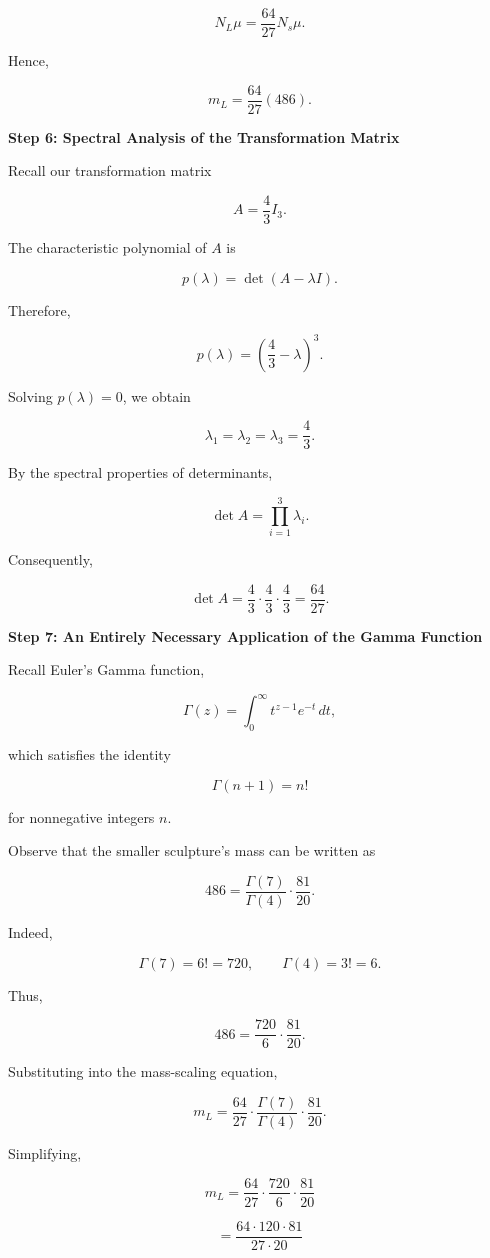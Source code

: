 \begin{enumerate}
 
 \[N_L\mu=\frac{64}{27}N_s\mu.\]

 Hence,

 
 \[m_L=\frac{64}{27}(486).\]

 \textbf{Step 6: Spectral Analysis of the Transformation Matrix}

 Recall our transformation matrix

 
 \[A=\frac43 I_3.\]

 The characteristic polynomial of $A$ is

 
 \[p(\lambda)=\det(A-\lambda I).\]

 Therefore,

 
 \[p(\lambda)=\left(\frac43-\lambda\right)^3.\]

 Solving $p(\lambda)=0$, we obtain

 
 \[\lambda_1=\lambda_2=\lambda_3=\frac43.\]

 By the spectral properties of determinants,

 
 \[\det A=\prod_{i=1}^{3}\lambda_i.\]

 Consequently,

 
 \[\det A=\frac43\cdot\frac43\cdot\frac43=\frac{64}{27}.\]

 \textbf{Step 7: An Entirely Necessary Application of the Gamma Function}

 Recall Euler's Gamma function,

 
 \[\Gamma(z)=\int_0^\infty t^{z-1}e^{-t}\,dt,\]

 which satisfies the identity

 
 \[\Gamma(n+1)=n!\]

 for nonnegative integers $n$.

 Observe that the smaller sculpture's mass can be written as

 
 \[486=\frac{\Gamma(7)}{\Gamma(4)}\cdot\frac{81}{20}.\]

 Indeed,

 
 \[\Gamma(7)=6!=720,\qquad \Gamma(4)=3!=6.\]

 Thus,

 
 \[486=\frac{720}{6}\cdot\frac{81}{20}.\]

 Substituting into the mass-scaling equation,

 
 \[m_L=\frac{64}{27}\cdot\frac{\Gamma(7)}{\Gamma(4)}\cdot\frac{81}{20}.\]

 Simplifying,

 
 \[m_L=\frac{64}{27}\cdot\frac{720}{6}\cdot\frac{81}{20}\]

 \[=\frac{64\cdot120\cdot81}{27\cdot20}\]


\end{enumerate}
